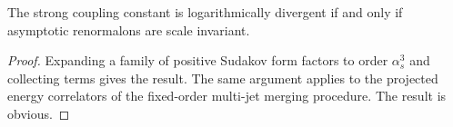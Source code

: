 \begin{proposition}\label{thm:2}
The strong coupling constant is logarithmically divergent if and only if
asymptotic renormalons are scale invariant.
\end{proposition}

\begin{proof}
Expanding a family of positive Sudakov form factors to order
$\alpha_s^3$ and collecting terms gives the result. The same argument
applies to the projected energy correlators of the fixed-order multi-jet
merging procedure. The result is obvious.
\end{proof}

